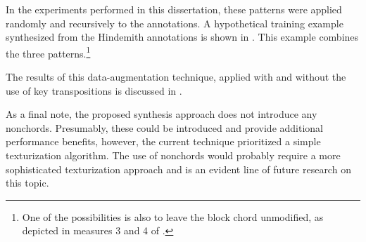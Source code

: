 
In the experiments performed in this dissertation, these
patterns were applied randomly and recursively to the
annotations. A hypothetical training example synthesized
from the Hindemith annotations is shown in
. This example combines the
three patterns.\footnote{One of the possibilities is also to
leave the block chord unmodified, as depicted in measures 3
and 4 of .}


The results of this data-augmentation technique, applied
with and without the use of key transpositions is discussed
in .

As a final note, the proposed synthesis approach does not
introduce any \gls{nonchord}s. Presumably, these could be
introduced and provide additional performance benefits,
however, the current technique prioritized a simple
texturization algorithm. The use of \gls{nonchord}s would
probably require a more sophisticated texturization approach
and is an evident line of future research on this topic.
